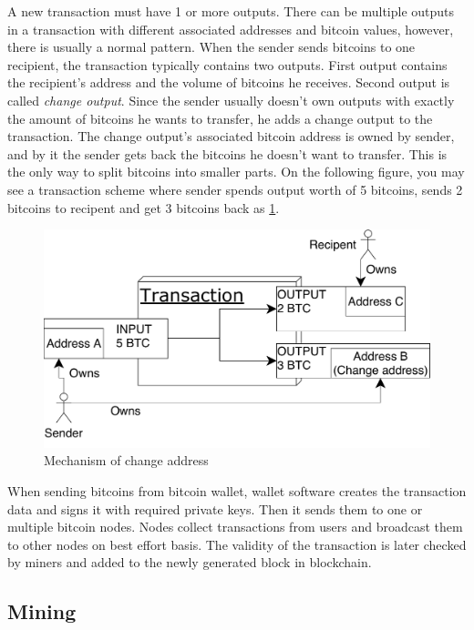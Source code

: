 \documentclass[
  digital, %
  table,   %
  lof,     %
  lot,     %
  oneside
]{fithesis3}
\begin{document}
A new transaction must have 1 or more outputs.
There can be multiple outputs in a transaction with different associated addresses and bitcoin values,
however, there is usually a normal pattern. When the sender sends bitcoins to one recipient,
the transaction typically contains two outputs.
First output contains the recipient's address and the volume of bitcoins he receives.
Second output is called \emph{change output}.
Since the sender usually doesn't own outputs with exactly the amount of bitcoins
he wants to transfer, he adds a change output to the transaction.
The change output's associated bitcoin address is owned by sender,
and by it the sender gets back the bitcoins he doesn't want to transfer.
This is the only way to split bitcoins into smaller parts. 
On the following figure, you may see a transaction scheme where sender spends output worth of 5 bitcoins,
sends 2 bitcoins to recipent and get 3 bitcoins back as \ref{change}.
 
\begin{figure}[!htb]
    \centering
    \includegraphics[width=1\textwidth]{change}
    \caption{Mechanism of change address}
    \label{change}
\end{figure}
 
When sending bitcoins from bitcoin wallet,
 wallet software creates the transaction data and signs it with required private keys.
 Then it sends them to one or multiple bitcoin nodes.
Nodes collect transactions from users and broadcast them to other nodes on best effort basis.
The validity of the transaction is later checked by miners and added to the newly generated block
in blockchain.

\subsection{Mining}
\end{document}
